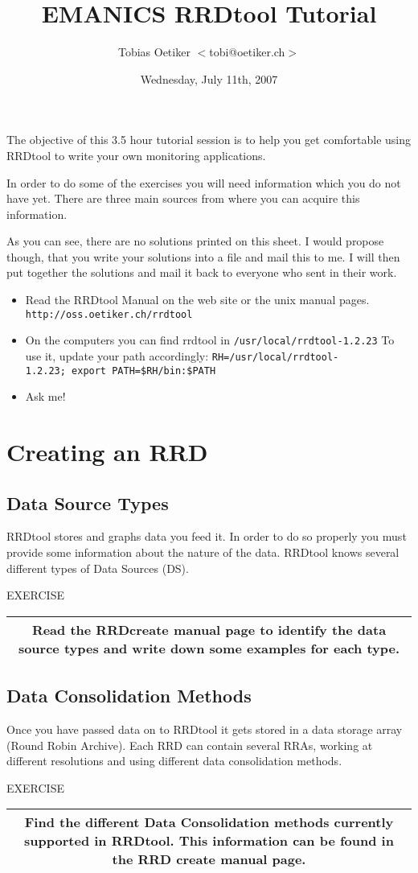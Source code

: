 \documentclass[a4paper,12pt]{article}
\title{EMANICS RRDtool Tutorial}
\date{Wednesday, July 11th, 2007}
\author{Tobias Oetiker $<$tobi@oetiker.ch$>$}
\newenvironment{work}{\textsf{\tiny EXERCISE}\nopagebreak\\[0.3ex]\begin{tabular}{|c|}
 \hline
 \begin{minipage}{0.965\linewidth}%
 \setlength{\parskip}{1.6ex plus 0.6ex minus 0.4ex}%
 \rule{0pt}{2.8ex}\ignorespaces}
{\rule[-1.8ex]{0pt}{0pt}\end{minipage}\\
 \hline
 \end{tabular}}
\newcommand{\ex}[1]{\subsection{#1}}
\newcommand{\cmd}[1]{\texttt{\mbox{#1}}}
\begin{document}
\maketitle

The objective of this 3.5 hour tutorial session is to help you get
comfortable using RRDtool to write your own monitoring applications.

In order to do some of the exercises you will need information which
you do not have yet. There are three main sources from where you can
acquire this information.

As you can see, there are no solutions printed on this sheet. I would
propose though, that you write your solutions into a file and mail
this to me. I will then put together the solutions and mail it back
to everyone who sent in their work.

\begin{itemize}
\item Read the RRDtool Manual on the web site or the unix manual
  pages.\\ \cmd{http://oss.oetiker.ch/rrdtool}
\item On the computers you can find rrdtool in \cmd{/usr/local/rrdtool-1.2.23}
  To use it, update your path accordingly:
\cmd{RH=/usr/local/rrdtool-1.2.23; export PATH=\$RH/bin:\$PATH}
\item Ask me!
\end{itemize}

\newpage
\section{Creating an RRD}
\ex{Data Source Types}

RRDtool stores and graphs data you feed it. In order to do so
properly you must provide some information about the nature of the
data. RRDtool knows several different types of Data Sources (DS).

\begin{work}
  Read the RRDcreate manual page to identify the data source types
  and write down some examples for each type.
\end{work}

\ex{Data Consolidation Methods}

Once you have passed data on to RRDtool it gets stored in a data
storage array (Round Robin Archive). Each RRD can contain several
RRAs, working at different resolutions and using different data
consolidation methods.

\begin{work}
  Find the different Data Consolidation methods currently supported in
  RRDtool. This information can be found in the RRD create manual
  page.
\end{work}
\end{document}

